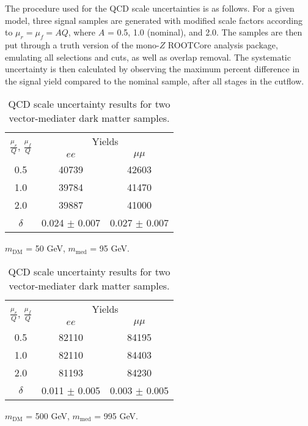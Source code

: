 The procedure used for the QCD scale uncertainties is as follows. For a given model, three signal samples are generated with modified scale factors according to $\mu_r = \mu_f = AQ$, where $A$ = 0.5, 1.0 (nominal), and 2.0. The samples are then put through a truth version of the mono-$Z$ ROOTCore analysis package, emulating all selections and cuts, as well as overlap removal. The systematic uncertainty is then calculated by observing the maximum percent difference in the signal yield compared to the nominal sample, after all stages in the cutflow. 

\begin{table}[!htb]
    \begin{subtable}{.5\linewidth}
      \centering
\begin{tabular}{|c||c|c|}
\hline
\multirow{2}{*}{$\frac{\mu_r}{Q}$, $\frac{\mu_f}{Q}$} & \multicolumn{2}{c|}{Yields}     \\ \cline{2-3} 
                              & $ee$           & $\mu\mu$       \\ \hline \hline
0.5                           & 40739          & 42603          \\ \hline
1.0                           & 39784          & 41470          \\ \hline
2.0                           & 39887          & 41000          \\ \hline \hline
$\delta$                      & 0.024 $\pm$ 0.007 & 0.027 $\pm$ 0.007 \\ \hline
\end{tabular}
\caption{$m_{\text{DM}}$ = 50 GeV, $m_{\text{med}}$ = 95 GeV.}
    \end{subtable}%
    \begin{subtable}{.5\linewidth}
      \centering
\begin{tabular}{|c||c|c|}
\hline
\multirow{2}{*}{$\frac{\mu_r}{Q}$, $\frac{\mu_f}{Q}$} & \multicolumn{2}{c|}{Yields}     \\ \cline{2-3} 
                              & $ee$           & $\mu\mu$       \\ \hline \hline
0.5                           & 82110          & 84195          \\ \hline
1.0                           & 82110          & 84403          \\ \hline
2.0                           & 81193          & 84230          \\ \hline \hline
$\delta$                      & 0.011 $\pm$ 0.005 & 0.003 $\pm$ 0.005 \\ \hline
\end{tabular}
\caption{$m_{\text{DM}}$ = 500 GeV, $m_{\text{med}}$ = 995 GeV.}
    \end{subtable} 
    \caption[QCD scale uncertainty results for vector-mediater dark matter samples]{QCD scale uncertainty results for two vector-mediater dark matter samples.}
\label{tbl:qcdresults}
\end{table}

